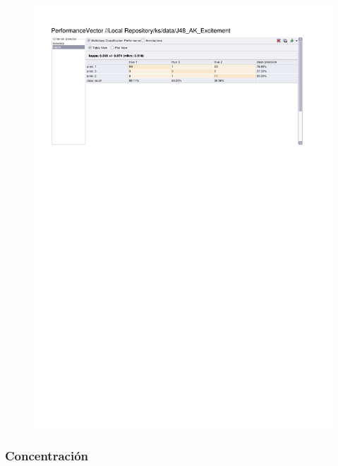 \begin{figure}[htp]
  \centerline{\includegraphics[trim=0 683 0 60,clip,width=16.09cm]{results/J48_K_Excitement.pdf}} \caption{
} \label{J48_K_Excitement}
\end{figure}

\clearpage
\FloatBarrier
\subsubsection{Concentración}

